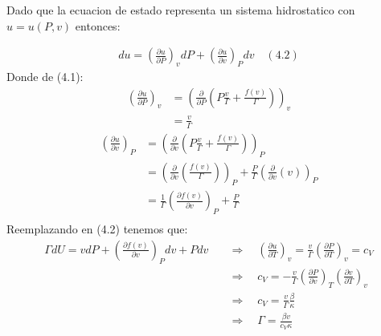 \documentclass[a4paper]{article}
\begin{document}
    \begin{answer}
        Dado que la ecuacion de estado representa un sistema hidrostatico con $u = u(P,v)$ entonces:

        \begin{align*}
            du = \left( \frac{\partial u}{\partial P} \right)_v dP + \left( \frac{\partial u}{\partial v} \right)_P dv \quad (4.2)
        \end{align*}
        Donde de (4.1):
        \begin{align*}
            \left(\frac {\partial u}{\partial P}\right)_v &= \left(
                \frac{\partial}{\partial P} \left(  P\frac v\Gamma + \frac{f(v)}\Gamma \right)
            \right)_v \\ 
            &= \frac{v}{\Gamma} 
        \end{align*}
        \begin{align*}
            \left(\frac {\partial u}{\partial v}\right)_P &= \left(
                \frac{\partial}{\partial v} \left(  P\frac v\Gamma + \frac{f(v)}\Gamma \right)
            \right)_P\\
            &= \left( \frac{\partial}{\partial v} \left( \frac{f(v)}\Gamma \right) \right)_P + \frac P \Gamma\left( \frac{\partial}{\partial v} \left(  v \right) \right)_P\\
            &= \frac 1\Gamma \left( \frac{\partial f(v)}{\partial v} \right)_P + \frac P \Gamma\\
        \end{align*}
        Reemplazando en (4.2) tenemos que:
        \begin{align*}
            \Gamma dU = v dP + \left( \frac{\partial f(v)}{\partial v} \right)_P dv + P dv \quad  &\Rightarrow \quad \left(\frac {\partial u}{\partial T}\right)_v = \frac v\Gamma \left( \frac{\partial P}{\partial T} \right)_v = c_V\\
            &\Rightarrow \quad c_V =- \frac v\Gamma \left( \frac{\partial P}{\partial v } \right)_T \left( \frac{\partial v}{\partial T} \right)_v\\
            &\Rightarrow \quad c_V = \frac v\Gamma \frac \beta \kappa \\
            &\Rightarrow \quad \Gamma = \frac{\beta v}{c_V \kappa}
        \end{align*}
       
    \end{answer}
    
\end{document}
